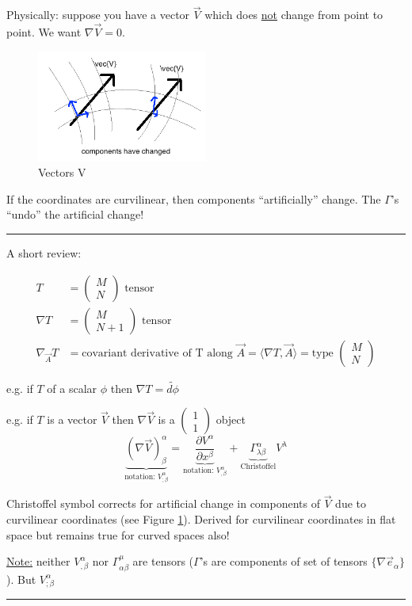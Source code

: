 \documentclass[a4paper]{article} %
\newcommand{\review}[1]
{
\hrule
A short review:

#1
\hrule
}
\newcommand{\pmx}[1]{
\begin{pmatrix}
#1
\end{pmatrix}
}
\renewcommand{\tilde}{\widetilde}
\begin{document}
Physically: suppose you have a vector $\vec{V}$ which does \underline{not} change from point to point. We want $\nabla \vec{V}=0$.

\begin{figure}[h]
\centering
\includegraphics[width=0.5\textwidth]{images/vectors-v.png}
\caption{Vectors V}
\label{Christoffel image}
\end{figure}

If the coordinates are curvilinear, then components ``artificially'' change. The $\Gamma$'s ``undo'' the artificial change!


\review{
\begin{align*}
T&=\pmx{M\\N}\text{ tensor}\\
\nabla T&=\pmx{M\\N+1}\text{ tensor}\\
\nabla_{\vec{A}}T&=\text{covariant derivative of T along }\vec{A}=\langle\nabla T,\vec{A}\rangle=\text{type }\pmx{M\\N}
\end{align*}

e.g. if $T$ of a scalar $\phi$ then $\nabla T=\tilde{d\phi}$

e.g. if $T$ is a vector $\vec{V}$ then $\nabla \vec{V}$ is a $\pmx{1\\1}$ object
\begin{equation}
\underbrace{(\nabla \vec{V})^{\alpha}_{\beta}}_{\text{notation: }V^{\alpha}_{;\beta}}=
\underbrace{\frac{\partial V^{\alpha}}{\partial x^{\beta}}}_{\text{notation: }V^{\alpha}_{,\beta}}
+\underbrace{\Gamma^{\alpha}_{\lambda\beta}}_{\text{Christoffel}}V^{\lambda}
\end{equation}

Christoffel symbol corrects for artificial change in components of $\vec{V}$ due to curvilinear coordinates (see Figure \ref{Christoffel image}). Derived for curvilinear coordinates in flat space but remains true for curved spaces also!

\underline{Note:} neither $V^{\alpha}_{,\beta}$ nor $\Gamma^{\mu}_{\alpha\beta}$ are tensors ($\Gamma$'s are components of set of tensors $\{\nabla \vec{e}_{\alpha}\}$). But $V^{\alpha}_{;\beta}$
}
\end{document}
